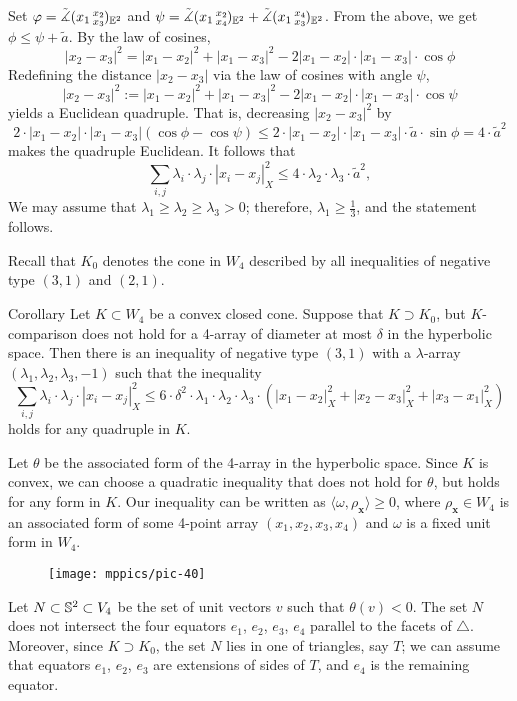 \documentclass[a4paper,10pt]{article}
\begin{document}
Set $\varphi=\tilde\measuredangle(x_1\,{}^{x_2}_{x_3}\hspace{-0.2ex})_{\mathbb{E}^2}$ and $\psi=\tilde\measuredangle(x_1\,{}^{x_2}_{x_4}\hspace{-0.2ex})_{\mathbb{E}^2}+\tilde\measuredangle(x_1\,{}^{x_4}_{x_3}\hspace{-0.2ex})_{\mathbb{E}^2}$.
From the above, we get $\phi\le \psi+\tilde a$.
By the law of cosines,
\[|x_2-x_3|^2=|x_1-x_2|^2+ |x_1-x_3|^2-2|x_1-x_2|\cdot|x_1-x_3|\cdot\cos\phi\]
Redefining the distance $|x_2-x_3|$ via the law of cosines with angle $\psi$,
\[|x_2-x_3|^2\mathrel{:=}|x_1-x_2|^2+ |x_1-x_3|^2-2|x_1-x_2|\cdot|x_1-x_3|\cdot\cos\psi\]
yields a Euclidean quadruple.
That is, decreasing $|x_2-x_3|^2$ by
\[2\cdot |x_1-x_2|\cdot|x_1-x_3|(\cos\phi-\cos\psi)
\le
2\cdot|x_1-x_2|\cdot|x_1-x_3|\cdot \tilde a\cdot\sin\phi
=
4\cdot \tilde a^2\]
makes the quadruple Euclidean.
It follows that
\[\sum_{i,j}\lambda_i\cdot\lambda_j\cdot|x_i-x_j|_X^2\le 4\cdot \lambda_2\cdot\lambda_3\cdot\tilde a^2,\]
We may assume that $\lambda_1\ge \lambda_2\ge \lambda_3>0$;
therefore, $\lambda_1\ge \tfrac13$, and the statement follows.
\qeds

Recall that $K_0$ denotes the cone in $W_4$ described by all inequalities of negative type $(3,1)$ and $(2,1)$.

\begin{thm}{Corollary}\label{cor:squared-sides}
Let $K\subset W_4$ be a convex closed cone.
Suppose that $K\supset K_0$, but $K$-comparison does not hold for a 4-array of diameter at most $\delta$ in the hyperbolic space.
Then there is an inequality of negative type $(3,1)$ with a $\lambda$-array $(\lambda_1,\lambda_2,\lambda_3,-1)$ such that the inequality
\[\sum_{i,j}\lambda_i\cdot\lambda_j\cdot|x_i-x_j|_X^2\le 6\cdot\delta^2\cdot \lambda_1\cdot\lambda_2\cdot\lambda_3\cdot (|x_1-x_2|_X^2+|x_2-x_3|_X^2+|x_3-x_1|_X^2)\]
holds for any quadruple in $K$.
\end{thm}

Let $\theta$ be the associated form of the 4-array in the hyperbolic space.
Since $K$ is convex, we can choose a quadratic inequality that does not hold for $\theta$, but holds for any form in $K$.
Our inequality can be written as $\langle \omega,\rho_{\bm{x}} \rangle\ge 0$, where $\rho_{\bm{x}}\in W_4$ is an associated form of some 4-point array $(x_1,x_2,x_3,x_4)$ and $\omega$ is a fixed unit form in $W_4$.

\begin{wrapfigure}{o}{30mm}
\centering
\vskip-4mm
\texttt{[image: mppics/pic-40]}
\vskip-0mm
\end{wrapfigure}

Let $N\subset \mathbb{S}^2\subset V_4$ be the set of unit vectors $v$ such that $\theta(v)<0$.
The set $N$ does not intersect the four equators $e_1$, $e_2$, $e_3$, $e_4$ parallel to the facets of $\triangle$.
Moreover, since $K\supset K_0$, the set $N$ lies in one of triangles, say $T$;
we can assume that equators $e_1$, $e_2$, $e_3$ are extensions of sides of $T$, and $e_4$ is the remaining equator.
\end{document}
